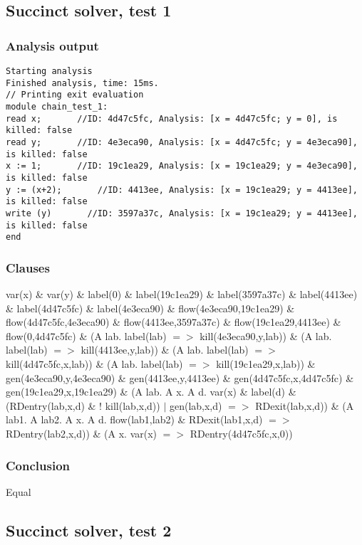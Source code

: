 \subsection{Succinct solver, test 1}
\subsubsection{Analysis output}
\begin{lstlisting}
Starting analysis
Finished analysis, time: 15ms.
// Printing exit evaluation
module chain_test_1:
read x;       //ID: 4d47c5fc, Analysis: [x = 4d47c5fc; y = 0], is killed: false
read y;       //ID: 4e3eca90, Analysis: [x = 4d47c5fc; y = 4e3eca90], is killed: false
x := 1;       //ID: 19c1ea29, Analysis: [x = 19c1ea29; y = 4e3eca90], is killed: false
y := (x+2);       //ID: 4413ee, Analysis: [x = 19c1ea29; y = 4413ee], is killed: false
write (y)       //ID: 3597a37c, Analysis: [x = 19c1ea29; y = 4413ee], is killed: false
end
\end{lstlisting}
\subsubsection{Clauses}
var(x) \& var(y) \& 
label(0) \& label(19c1ea29) \& label(3597a37c) \& label(4413ee) \& label(4d47c5fc) \& label(4e3eca90) \& 
flow(4e3eca90,19c1ea29) \& flow(4d47c5fc,4e3eca90) \& flow(4413ee,3597a37c) \& flow(19c1ea29,4413ee) \& flow(0,4d47c5fc) \& 
(A lab. label(lab) $=>$ kill(4e3eca90,y,lab)) \& (A lab. label(lab) $=>$ kill(4413ee,y,lab)) \& (A lab. label(lab) $=>$ kill(4d47c5fc,x,lab)) \& (A lab. label(lab) $=>$ kill(19c1ea29,x,lab)) \& 
gen(4e3eca90,y,4e3eca90) \& gen(4413ee,y,4413ee) \& gen(4d47c5fc,x,4d47c5fc) \& gen(19c1ea29,x,19c1ea29) \& 
(A lab. A x. A d. var(x) \& label(d) \& (RDentry(lab,x,d) \& ! kill(lab,x,d)) $|$ gen(lab,x,d) $=>$ RDexit(lab,x,d)) \& 
(A lab1. A lab2. A x. A d. flow(lab1,lab2) \& RDexit(lab1,x,d) $=>$ RDentry(lab2,x,d)) \& 
(A x. var(x) $=>$ RDentry(4d47c5fc,x,0))
\subsubsection{Conclusion}
Equal

\subsection{Succinct solver, test 2}
